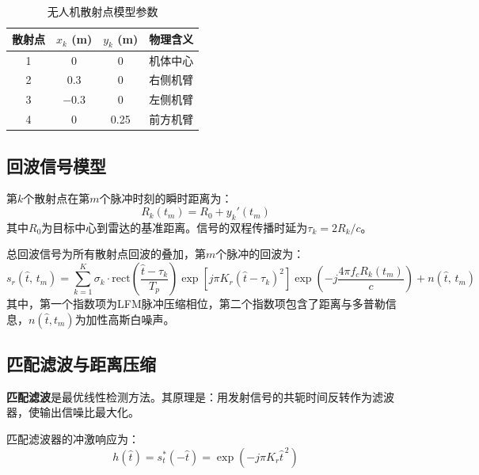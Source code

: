 \documentclass[12pt, a4paper]{article}
\begin{document}
\begin{table}[H]
\centering
\begin{tabularx}{0.7\textwidth}{cCCC}
\toprule
{}\color{white}\bfseries 散射点 &
  \color{white}\bfseries $x_k$ (m) &
  \color{white}\bfseries $y_k$ (m) &
  \color{white}\bfseries 物理含义 \\
 & 0 & 0 & 机体中心 \\
2 & 0.3 & 0 & 右侧机臂 \\
3 & $-$0.3 & 0 & 左侧机臂 \\
4 & 0 & 0.25 & 前方机臂 \\
\bottomrule
\end{tabularx}
\caption{无人机散射点模型参数}
\label{tab:scatter}
\end{table}

\subsection{回波信号模型}

第$k$个散射点在第$m$个脉冲时刻的瞬时距离为：
\begin{equation}
  R_k(t_m) = R_0 + y_k'(t_m)
  \label{eq:range}
\end{equation}
其中$R_0$为目标中心到雷达的基准距离。信号的双程传播时延为$\tau_k = 2R_k/c$。

总回波信号为所有散射点回波的叠加，第$m$个脉冲的回波为：
\begin{equation}
  s_r(\hat{t},\, t_m) = \sum_{k=1}^{K} \sigma_k \cdot
  \mathrm{rect}\!\left(\frac{\hat{t}-\tau_k}{T_p}\right)
  \exp\!\left[j\pi K_r\!\left(\hat{t}-\tau_k\right)^{2}\right]
  \exp\!\left(-j\frac{4\pi f_c R_k(t_m)}{c}\right)
  + n(\hat{t},\, t_m)
  \label{eq:echo}
\end{equation}
其中，第一个指数项为LFM脉冲压缩相位，第二个指数项包含了距离与多普勒信息，$n(\hat{t}, t_m)$为加性高斯白噪声。

\subsection{匹配滤波与距离压缩}
\label{subsec:matched_filter}

\textbf{匹配滤波}是最优线性检测方法。其原理是：用发射信号的共轭时间反转作为滤波器，使输出信噪比最大化\cite{ref_radar_signal}。

匹配滤波器的冲激响应为：
\begin{equation}
  h(\hat{t}) = s_t^{*}(-\hat{t}) = \exp\!\left(-j\pi K_r \hat{t}^{\,2}\right)
  \label{eq:matched_filter}
\end{equation}
\end{document}
